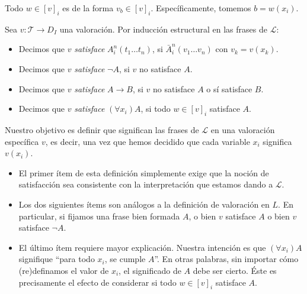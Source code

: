 \begin{remark}
Todo $w \in [v]_i$ es de la forma $v_b \in [v]_i$. Específicamente, tomemos $b = w(x_i)$.
\end{remark}

\begin{definition}
Sea $v : \mathscr T \to D_I$ una valoración. Por inducción estructural en las frases de $\mathscr L$:

\begin{itemize}
    \item Decimos que $v$ \textit{satisface} $A_i^n(t_1 \dots t_n)$, si $\bar A_i^n(v_1 \dots v_n)$ con $v_k = v(x_k)$.
    \item Decimos que $v$ \textit{satisface} $\neg A$, si $v$ no satisface $A$.
    \item Decimos que $v$ \textit{satisface} $A \to B$, si $v$ no satisface $A$ o sí satisface $B$.
    \item Decimos que $v$ \textit{satisface} $(\forall x_i) A$, si todo $w \in [v]_i$ satisface $A$.
\end{itemize}
\end{definition}

\begin{remarks}
Nuestro objetivo es definir que significan las frases de $\mathscr L$ en una valoración específica $v$, es decir, una vez que hemos decidido que cada variable $x_i$ significa $v(x_i)$.

\begin{itemize}
    \item El primer ítem de esta definición simplemente exige que la noción de satisfacción sea consistente con la interpretación que estamos dando a $\mathscr L$.
    
    \item Los dos siguientes ítems son análogos a la definición de valoración en $L$. En particular, si fijamos una frase bien formada $A$, o bien $v$ satisface $A$ o bien $v$ satisface $\neg A$.
    
    \item El último ítem requiere mayor explicación. Nuestra intención es que $(\forall x_i) A$ signifique ``para todo $x_i$, se cumple $A$''. En otras palabras, sin importar cómo (re)definamos el valor de $x_i$, el significado de $A$ debe ser cierto. Éste es precisamente el efecto de considerar si todo $w \in [v]_i$ satisface $A$.
\end{itemize}
\end{remarks}

